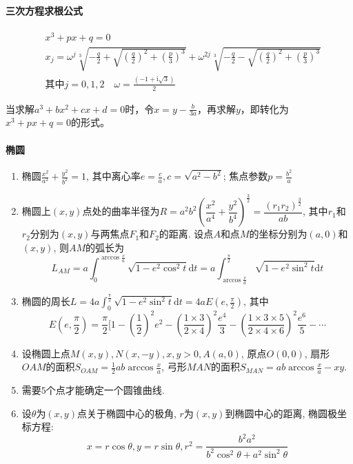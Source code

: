 \documentclass{article}
\begin{document}
\paragraph{三次方程求根公式}

\begin{align}
    & x^3+px+q=0        \nonumber\\
    & x_j=\omega^j\sqrt[3]{-\frac{q}{2}+\sqrt{(\frac{q}{2})^2+(\frac{p}{3})^3}}+\omega^{2j}\sqrt[3]{-\frac{q}{2}-\sqrt{(\frac{q}{2})^2+(\frac{p}{3})^3}}\nonumber\\
    & \mbox{其中}j=0,1,2\quad \omega=\frac{(-1+\mathrm{i}\sqrt{3})}{2}\nonumber   
\end{align}

当求解$a^3+bx^2+cx+d=0$时，令$x=y-\frac{b}{3a}$，再求解$y$，即转化为$x^3+px+q=0$的形式。

\paragraph{椭圆}

\begin{enumerate}
    \item 椭圆$\frac{x^2}{a^2} + \frac{y^2}{b^2} = 1$, 其中离心率$e = \frac{c}{a}, c = \sqrt{a^2 - b^2}$; 焦点参数$p = \frac{b^2}{a}$
    \item 椭圆上$(x, y)$点处的曲率半径为$R = a^2 b^2 (\dfrac{x^2}{a^4} + \dfrac{y^2}{b^4})^\frac{3}{2} = \dfrac{(r_1 r_2)^\frac{3}{2}}{ab}$, 其中$r_1$和$r_2$分别为$(x, y)$与两焦点$F_1$和$F_2$的距离. 设点$A$和点$M$的坐标分别为$(a, 0)$和$(x, y)$, 则$AM$的弧长为
    \[ L_{AM} = a \int_0^{\arccos{\frac{x}{a}}} \sqrt{1 - e^2 \cos^2 t} \textrm{d} t = a \int_{\arccos{\frac{x}{a}}}^\frac{\pi}{2} \sqrt{1 - e^2 \sin^2 t} \textrm{d} t\]
    \item 椭圆的周长$L = 4a \int_0^{\frac{\pi}{2}} \sqrt{1 - e^2 \sin^2 t } \textrm{d} t = 4a E(e, \frac{\pi}{2})$, 其中
    \[ E(e, \frac{\pi}{2}) = \frac{\pi}{2} [ 1 - (\frac{1}{2})^2 e^2 - (\frac{1 \times 3}{2 \times 4})^2 \frac{e^4}{3} - (\frac{1 \times 3 \times 5}{2 \times 4 \times 6})^2 \frac{e^6}{5} - \cdots\]
    \item 设椭圆上点$M(x, y), N(x, -y), x, y > 0, A(a, 0)$, 原点$O(0, 0)$, 扇形$OAM$的面积$S_{OAM} = \frac{1}{2} ab \arccos{\frac{x}{a}}$, 弓形$MAN$的面积$S_{MAN} = ab \arccos{\frac{x}{a}} - xy$.
    \item 需要$5$个点才能确定一个圆锥曲线.
    \item 设$\theta$为$(x, y)$点关于椭圆中心的极角, $r$为$(x, y)$到椭圆中心的距离, 椭圆极坐标方程:
    \[ x = r \cos \theta, y = r \sin \theta, r^2 = \frac{b^2 a^2}{b^2 \cos^2 \theta + a^2 \sin^2 \theta}\]
\end{enumerate}
\end{document}
